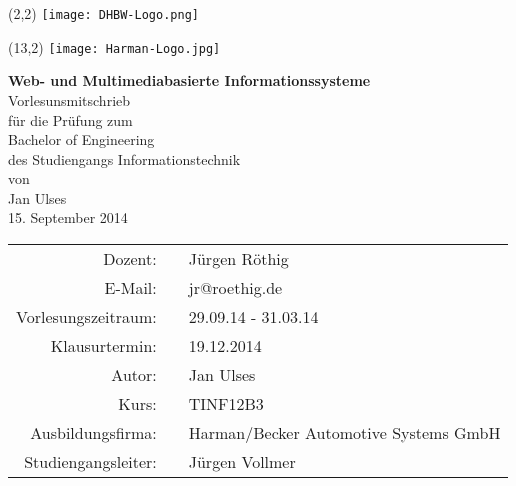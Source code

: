 \begin{titlepage}

  \onehalfspacing
  \begin{textblock}{21}(2,2)
	\texttt{[image: DHBW-Logo.png]}
  \end{textblock}
  \begin{textblock}{21}(13,2)
	\texttt{[image: Harman-Logo.jpg]}	
  \end{textblock}  
  \begin{center}	
	\vspace*{3,7cm}
    \huge
	\textbf{Web- und Multimediabasierte Informationssysteme\\}
	\vspace*{1,5cm}
    \Large Vorlesunsmitschrieb\\
    \vspace*{1cm}
    \normalsize für die Prüfung zum\\
    \Large Bachelor of Engineering\\
    \normalsize des Studiengangs \Large Informationstechnik\\
    \vspace*{0,75cm}
    \normalsize von\\
    \Large Jan Ulses\\
    \vspace*{0,75cm}
    \large 15. September 2014\\
    \vspace*{1,9cm}
    \small
    \renewcommand{\arraystretch}{1,2}
    \singlespacing
    \begin{tabular}{rcl}
    	\hline
  		Dozent: & & Jürgen Röthig\\
  		E-Mail: & & jr@roethig.de\\
  		Vorlesungszeitraum: & \hspace*{0,5mm} & 29.09.14 - 31.03.14 \\
  		Klausurtermin: & & 19.12.2014\\
  		Autor: & & Jan Ulses\\
  		Kurs: & & TINF12B3\\
  		Ausbildungsfirma: & & Harman/Becker Automotive Systems GmbH\\
  		Studiengangsleiter: & & Jürgen Vollmer\\
  		\hline
 	\end{tabular}
    
  \end{center}
  \normalsize
  \vfill
  
\end{titlepage}